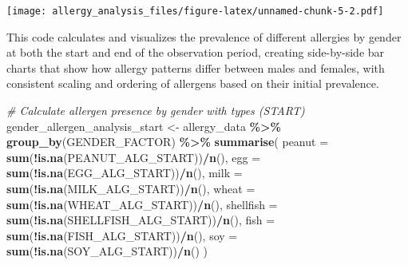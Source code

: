 \documentclass[
]{article}
\newenvironment{Shaded}{\begin{snugshade}}{\end{snugshade}}
\newcommand{\AttributeTok}[1]{\textcolor[rgb]{0.13,0.29,0.53}{#1}}
\newcommand{\CommentTok}[1]{\textcolor[rgb]{0.56,0.35,0.01}{\textit{#1}}}
\newcommand{\FunctionTok}[1]{\textcolor[rgb]{0.13,0.29,0.53}{\textbf{#1}}}
\newcommand{\NormalTok}[1]{#1}
\newcommand{\OtherTok}[1]{\textcolor[rgb]{0.56,0.35,0.01}{#1}}
\newcommand{\SpecialCharTok}[1]{\textcolor[rgb]{0.81,0.36,0.00}{\textbf{#1}}}
\begin{document}
\texttt{[image: allergy\_analysis\_files/figure-latex/unnamed-chunk-5-2.pdf]}

This code calculates and visualizes the prevalence of different
allergies by gender at both the start and end of the observation period,
creating side-by-side bar charts that show how allergy patterns differ
between males and females, with consistent scaling and ordering of
allergens based on their initial prevalence.

\begin{Shaded}
\begin{Highlighting}[]
\CommentTok{\# Calculate allergen presence by gender with types (START)}
\NormalTok{gender\_allergen\_analysis\_start }\OtherTok{\textless{}{-}}\NormalTok{ allergy\_data }\SpecialCharTok{\%\textgreater{}\%}
  \FunctionTok{group\_by}\NormalTok{(GENDER\_FACTOR) }\SpecialCharTok{\%\textgreater{}\%}
  \FunctionTok{summarise}\NormalTok{(}
    \AttributeTok{peanut =} \FunctionTok{sum}\NormalTok{(}\SpecialCharTok{!}\FunctionTok{is.na}\NormalTok{(PEANUT\_ALG\_START))}\SpecialCharTok{/}\FunctionTok{n}\NormalTok{(),}
    \AttributeTok{egg =} \FunctionTok{sum}\NormalTok{(}\SpecialCharTok{!}\FunctionTok{is.na}\NormalTok{(EGG\_ALG\_START))}\SpecialCharTok{/}\FunctionTok{n}\NormalTok{(),}
    \AttributeTok{milk =} \FunctionTok{sum}\NormalTok{(}\SpecialCharTok{!}\FunctionTok{is.na}\NormalTok{(MILK\_ALG\_START))}\SpecialCharTok{/}\FunctionTok{n}\NormalTok{(),}
    \AttributeTok{wheat =} \FunctionTok{sum}\NormalTok{(}\SpecialCharTok{!}\FunctionTok{is.na}\NormalTok{(WHEAT\_ALG\_START))}\SpecialCharTok{/}\FunctionTok{n}\NormalTok{(),}
    \AttributeTok{shellfish =} \FunctionTok{sum}\NormalTok{(}\SpecialCharTok{!}\FunctionTok{is.na}\NormalTok{(SHELLFISH\_ALG\_START))}\SpecialCharTok{/}\FunctionTok{n}\NormalTok{(),}
    \AttributeTok{fish =} \FunctionTok{sum}\NormalTok{(}\SpecialCharTok{!}\FunctionTok{is.na}\NormalTok{(FISH\_ALG\_START))}\SpecialCharTok{/}\FunctionTok{n}\NormalTok{(),}
    \AttributeTok{soy =} \FunctionTok{sum}\NormalTok{(}\SpecialCharTok{!}\FunctionTok{is.na}\NormalTok{(SOY\_ALG\_START))}\SpecialCharTok{/}\FunctionTok{n}\NormalTok{()}
\NormalTok{  )}


\end{Highlighting}
\end{Shaded}
\end{document}
